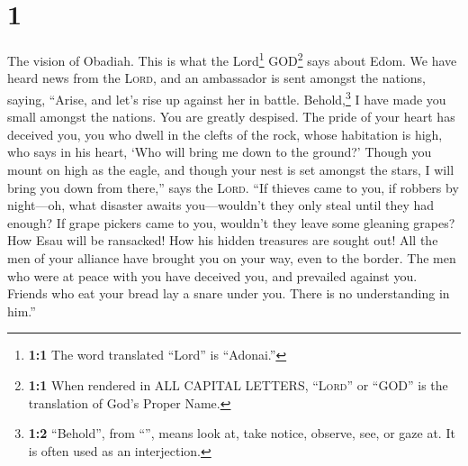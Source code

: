 \hypertarget{section}{%
\section{1}\label{section}}

 The vision of Obadiah. This is what the Lord\footnote{\textbf{1:1}
  The word translated ``Lord'' is ``Adonai.''} GOD\footnote{\textbf{1:1}
  When rendered in ALL CAPITAL LETTERS, ``\textsc{Lord}'' or ``GOD'' is
  the translation of God's Proper Name.} says about Edom. We have heard
news from the \textsc{Lord}, and an ambassador is sent amongst the
nations, saying, ``Arise, and let's rise up against her in battle.
 Behold,\footnote{\textbf{1:2} ``Behold'', from
  ``'', means look at, take notice, observe, see, or gaze
  at. It is often used as an interjection.} I have made you small
amongst the nations. You are greatly despised.  The pride
of your heart has deceived you, you who dwell in the clefts of the rock,
whose habitation is high, who says in his heart, `Who will bring me down
to the ground?'  Though you mount on high as the eagle,
and though your nest is set amongst the stars, I will bring you down
from there,'' says the \textsc{Lord}.  ``If thieves came
to you, if robbers by night---oh, what disaster awaits you---wouldn't
they only steal until they had enough? If grape pickers came to you,
wouldn't they leave some gleaning grapes?  How Esau will
be ransacked! How his hidden treasures are sought out! 
All the men of your alliance have brought you on your way, even to the
border. The men who were at peace with you have deceived you, and
prevailed against you. Friends who eat your bread lay a snare under you.
There is no understanding in him.''

